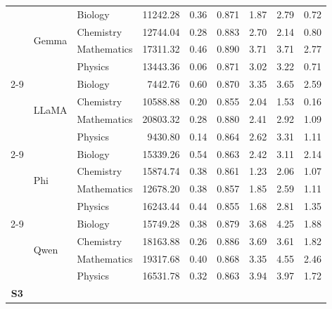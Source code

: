 \documentclass[a4paper,conference]{IEEEtran}
\begin{document}
\begin{table}[!t]
\begin{tabular}{|c|l|l|r|r|r|r|r|r|}
  & \multirow{4}{*}{Gemma}  & Biology     & 11242.28         & 0.36          & 0.871 & 1.87          & 2.79 & 0.72 \\
  &                         & Chemistry   & 12744.04         & 0.28          & 0.883 & 2.70          & 2.14 & 0.80 \\
  &                         & Mathematics & 17311.32         & 0.46          & 0.890 & 3.71          & 3.71 & 2.77 \\
  &                         & Physics     & 13443.36         & 0.06          & 0.871 & 3.02          & 3.22 & 0.71 \\ \cline{2-9}
  & \multirow{4}{*}{LLaMA}  & Biology     &  7442.76         & 0.60          & 0.870 & 3.35          & 3.65 & 2.59 \\
  &                         & Chemistry   & 10588.88         & 0.20          & 0.855 & 2.04          & 1.53 & 0.16 \\
  &                         & Mathematics & 20803.32         & 0.28          & 0.880 & 2.41          & 2.92 & 1.09 \\
  &                         & Physics     &  9430.80         & 0.14          & 0.864 & 2.62          & 3.31 & 1.11 \\ \cline{2-9}
  & \multirow{4}{*}{Phi}    & Biology     & 15339.26         & 0.54          & 0.863 & 2.42          & 3.11 & 2.14 \\
  &                         & Chemistry   & 15874.74         & 0.38          & 0.861 & 1.23          & 2.06 & 1.07 \\
  &                         & Mathematics & 12678.20         & 0.38          & 0.857 & 1.85          & 2.59 & 1.11 \\
  &                         & Physics     & 16243.44         & 0.44          & 0.855 & 1.68          & 2.81 & 1.35 \\ \cline{2-9}
  & \multirow{4}{*}{Qwen}   & Biology     & 15749.28         & 0.38          & 0.879 & 3.68          & 4.25 & 1.88 \\
  &                         & Chemistry   & 18163.88         & 0.26          & 0.886 & 3.69          & 3.61 & 1.82 \\
  &                         & Mathematics & 19317.68         & 0.40          & 0.868 & 3.35          & 4.55 & 2.46 \\
  &                         & Physics     & 16531.78         & 0.32          & 0.863 & 3.94          & 3.97 & 1.72 \\
\hline
\multirow{20}{*}{\textbf{S3}}

\end{tabular}
\end{table}
\end{document}
